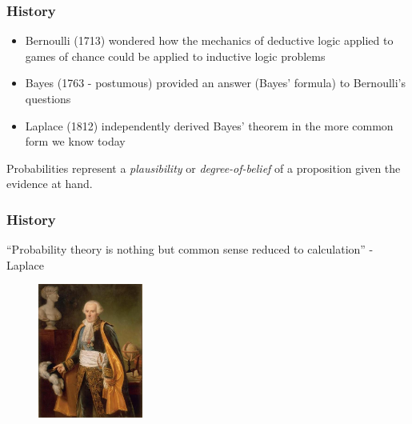 \begin{frame}

\frametitle{History}
\label{history}

\begin{itemize}
\item Bernoulli (1713) wondered how the mechanics of deductive logic applied to games of chance
could be applied to inductive logic problems

\item Bayes (1763 - postumous) provided an answer (Bayes' formula) to Bernoulli's questions

\item Laplace (1812) independently derived Bayes' theorem in the more common form we know today

\end{itemize}

Probabilities represent a \emph{plausibility} or \emph{degree-of-belief} of a proposition given the evidence at hand.

\end{frame}

\begin{frame}

\frametitle{History}
\label{history}

``Probability theory is nothing but common sense reduced to calculation'' - Laplace

\begin{figure}[htbp]
\centering
\includegraphics[keepaspectratio,width=\textwidth,height=125pt]{figures/laplace.jpg}
\label{laplace}
\end{figure}

\end{frame}

